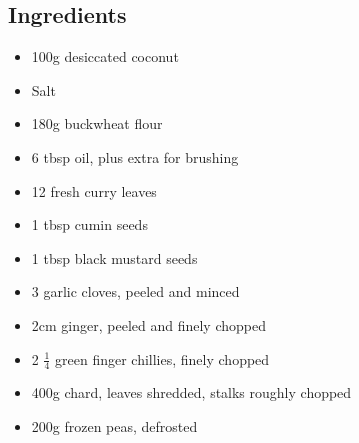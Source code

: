 \documentclass{book}
\begin{document}
\subsection*{Ingredients}
\begin{itemize}
\item 100g desiccated coconut
\item Salt
\item 180g buckwheat flour
\item 6 tbsp oil, plus extra for brushing
\item 12 fresh curry leaves
\item 1 tbsp cumin seeds
\item 1 tbsp black mustard seeds
\item 3 garlic cloves, peeled and minced
\item 2cm ginger, peeled and finely chopped
\item 2 $\frac{1}{4}$ green finger chillies, finely chopped
\item 400g chard, leaves shredded, stalks roughly chopped
\item 200g frozen peas, defrosted
\end{itemize}
\end{document}
